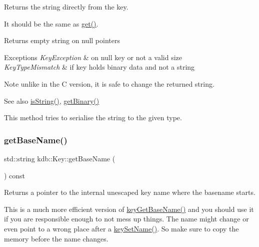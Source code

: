 \begin{DoxyReturn}{Returns}
the string directly from the key.
\end{DoxyReturn}
It should be the same as \hyperlink{classkdb_1_1Key_ac558a1f1b2cb50d77fbabcbb24950c05}{get()}. \begin{DoxyReturn}{Returns}
empty string on null pointers
\end{DoxyReturn}

\begin{DoxyExceptions}{Exceptions}
{\em Key\+Exception} & on null key or not a valid size \\
\hline
{\em Key\+Type\+Mismatch} & if key holds binary data and not a string\\
\hline
\end{DoxyExceptions}
\begin{DoxyNote}{Note}
unlike in the C version, it is safe to change the returned string.
\end{DoxyNote}
\begin{DoxySeeAlso}{See also}
\hyperlink{classkdb_1_1Key_a2170b1d9decef951b478454e3ee0b618}{is\+String()}, \hyperlink{classkdb_1_1Key_ada114aba31b321ddc984018b43a8568b}{get\+Binary()}
\end{DoxySeeAlso}
This method tries to serialise the string to the given type. \mbox{\label{classkdb_1_1Key_ab998c6e1b121b956653f01df5762aed8}} 
\subsubsection{\texorpdfstring{get\+Base\+Name()}{getBaseName()}}
{\footnotesize\ttfamily std\+::string kdb\+::\+Key\+::get\+Base\+Name (\begin{DoxyParamCaption}{ }\end{DoxyParamCaption}) const\hspace{0.3cm}{\ttfamily [inline]}}



Returns a pointer to the internal unescaped key name where the {\ttfamily basename} starts. 

This is a much more efficient version of \hyperlink{group__keyname_ga0992d26bcfca767cb8e77053a483eb64}{key\+Get\+Base\+Name()} and you should use it if you are responsible enough to not mess up things. The name might change or even point to a wrong place after a \hyperlink{group__keyname_ga7699091610e7f3f43d2949514a4b35d9}{key\+Set\+Name()}. So make sure to copy the memory before the name changes.

